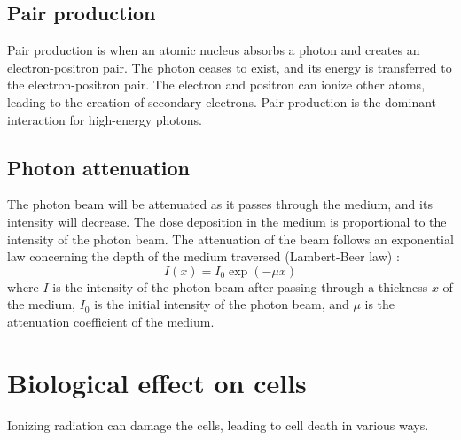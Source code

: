 \subsection{Pair production}
Pair production is when an atomic nucleus absorbs a photon and creates an electron-positron pair.
The photon ceases to exist, and its energy is transferred to the electron-positron pair.
The electron and positron can ionize other atoms, leading to the creation of secondary electrons.
Pair production is the dominant interaction for high-energy photons.


\subsection{Photon attenuation}
The photon beam will be attenuated as it passes through the medium, and its intensity will decrease.
The dose deposition in the medium is proportional to the intensity of the photon beam.
The attenuation of the beam follows an exponential law concerning the depth of the medium traversed (Lambert-Beer law) \cite{Beer1852}:
$$I(x) = I_0 \exp(-\mu x)$$
where $I$ is the intensity of the photon beam after passing through a thickness $x$ of the medium,
$I_0$ is the initial intensity of the photon beam,
and $\mu$ is the attenuation coefficient of the medium.







\section{Biological effect on cells}
Ionizing radiation can damage the cells, leading to cell death in various ways.

